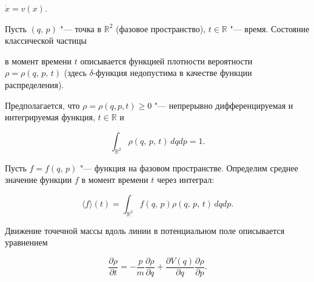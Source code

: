 

$\dot{x}=v(x).$




Пусть $(q,\, p)$ "--- точка в $\mathbb{R}^2$  (фазовое пространство), $t\in\mathbb{R}$ "--- время. Состояние классической частицы

в момент времени $t$ описывается функцией плотности вероятности $\rho=\rho (q,\, p,\, t)$ (здесь $\delta$-функция недопустима в качестве функции распределения).



Предполагается, что $\rho=\rho (q, p, t)\geq 0$ "--- непрерывно дифференцируемая и интегрируемая функция, $t \in

\mathbb{R}$  и



$$\int_{\mathbb{R}^2}\rho (q,\,p,\,t)\,dqdp=1.$$




Пусть $f = f (q,\, p)$ "--- функция на фазовом пространстве. Определим среднее значение функции $f$ в момент времени $t$ через интеграл:



$$

\langle f\rangle(t)=\int_{\mathbb{R}^2} f(q,\,p)\rho (q,\,p,\,t) \,dqdp.

$$


Движение точечной массы вдоль линии в потенциальном поле описывается уравнением

\begin{equation}

\label{pisk::FM:Lio}

\frac{\partial \rho}{\partial t}=-\frac{p}{m}\frac{\partial

\rho}{\partial q}+\frac{\partial V(q)}{\partial q} \frac{\partial

\rho}{\partial p}.

\end{equation}

